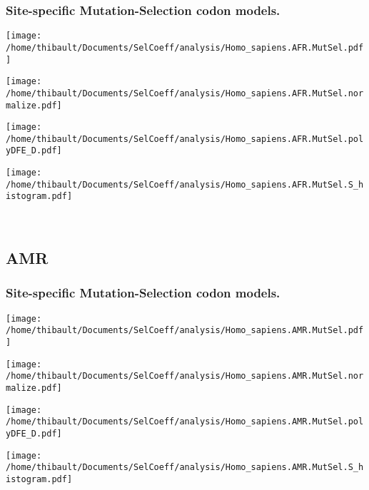 \subsubsection*{Site-specific Mutation-Selection codon models.} 
\begin{minipage}{0.49\linewidth} 
\texttt{[image: /home/thibault/Documents/SelCoeff/analysis/Homo\_sapiens.AFR.MutSel.pdf]} 
\end{minipage}
\begin{minipage}{0.49\linewidth} 
\texttt{[image: /home/thibault/Documents/SelCoeff/analysis/Homo\_sapiens.AFR.MutSel.normalize.pdf]} 
\end{minipage}
\begin{minipage}{0.49\linewidth} 
\texttt{[image: /home/thibault/Documents/SelCoeff/analysis/Homo\_sapiens.AFR.MutSel.polyDFE\_D.pdf]} 
\end{minipage}
\begin{minipage}{0.49\linewidth} 
\texttt{[image: /home/thibault/Documents/SelCoeff/analysis/Homo\_sapiens.AFR.MutSel.S\_histogram.pdf]} 
\end{minipage}
\\ 
\subsection{AMR} 
 
\subsubsection*{Site-specific Mutation-Selection codon models.} 
\begin{minipage}{0.49\linewidth} 
\texttt{[image: /home/thibault/Documents/SelCoeff/analysis/Homo\_sapiens.AMR.MutSel.pdf]} 
\end{minipage}
\begin{minipage}{0.49\linewidth} 
\texttt{[image: /home/thibault/Documents/SelCoeff/analysis/Homo\_sapiens.AMR.MutSel.normalize.pdf]} 
\end{minipage}
\begin{minipage}{0.49\linewidth} 
\texttt{[image: /home/thibault/Documents/SelCoeff/analysis/Homo\_sapiens.AMR.MutSel.polyDFE\_D.pdf]} 
\end{minipage}
\begin{minipage}{0.49\linewidth} 
\texttt{[image: /home/thibault/Documents/SelCoeff/analysis/Homo\_sapiens.AMR.MutSel.S\_histogram.pdf]} 
\end{minipage}
\\ 
